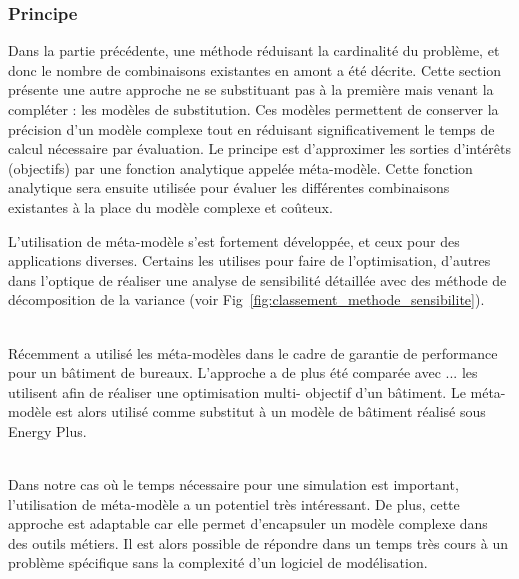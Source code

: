 \subsubsection{Principe} %
\label{ssub:principe}
Dans la partie précédente, une méthode réduisant la cardinalité du problème, et donc le
nombre de combinaisons existantes en amont a été décrite. Cette section présente une autre
approche ne se substituant pas à la première mais venant la compléter : les modèles de
substitution. Ces modèles permettent de conserver la précision d’un modèle complexe tout
en réduisant significativement le temps de calcul nécessaire par évaluation. Le principe
est d’approximer les sorties d’intérêts (objectifs) par une fonction analytique appelée
méta-modèle. Cette fonction analytique sera ensuite utilisée pour évaluer les différentes
combinaisons existantes à la place du modèle complexe et coûteux.

L’utilisation de méta-modèle s’est fortement développée, et ceux pour des
applications diverses. Certains les utilises pour faire de l’optimisation,
d’autres dans l’optique de réaliser une analyse de sensibilité détaillée avec des
méthode de décomposition de la variance (voir Fig~\ref{fig:classement_methode_sensibilite}).

~\\
Récemment  a utilisé les méta-modèles dans le cadre de garantie de
performance pour un bâtiment de bureaux. L’approche a de plus été comparée avec ...
\textcite{Armand-Decker2015} les utilisent afin de réaliser une optimisation multi-
objectif d’un bâtiment. Le méta-modèle est alors utilisé comme substitut à un modèle de
bâtiment réalisé sous Energy Plus.

~\\
Dans notre cas où le temps nécessaire pour une simulation est important, l’utilisation de
méta-modèle a un potentiel très intéressant. De plus, cette approche est adaptable car elle
permet d’encapsuler un modèle complexe dans des outils métiers. Il est alors possible de
répondre dans un temps très cours à un problème spécifique sans la complexité d’un
logiciel de modélisation.

